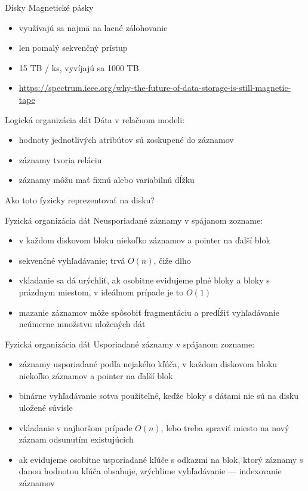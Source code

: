 \documentclass[12pt]{beamer}
\begin{document}
\begin{frame}[fragile]{Disky}
Magnetické pásky
\begin{itemize}
\item využívajú sa najmä na lacné zálohovanie
\item len pomalý sekvenčný prístup
\item 15 TB / ks, vyvíjajú sa 1000 TB
\item {\scriptsize\url{https://spectrum.ieee.org/why-the-future-of-data-storage-is-still-magnetic-tape}}
\end{itemize}
\end{frame}

\begin{frame}[fragile]{Logická organizácia dát}
Dáta v relačnom modeli:
\begin{itemize}
\item hodnoty jednotlivých atribútov sú zoskupené do záznamov
\item záznamy tvoria reláciu
\item záznamy môžu mať fixnú alebo variabilnú dĺžku
\end{itemize}
\vspace*{3mm}
Ako toto fyzicky reprezentovať na disku?
\end{frame}

\begin{frame}[fragile]{Fyzická organizácia dát}
Neusporiadané záznamy v spájanom zozname:
\begin{itemize}
\item v každom diskovom bloku niekoľko záznamov a pointer na ďalší blok
\item sekvenčné vyhľadávanie; trvá $O(n)$, čiže dlho
\item vkladanie sa dá urýchliť, ak osobitne evidujeme plné bloky a bloky s prázdnym miestom, v ideálnom prípade je to $O(1)$
\item mazanie záznamov môže spôsobiť fragmentáciu a predĺžiť vyhľadávanie neúmerne množstvu uložených dát
\end{itemize}
\end{frame}

\begin{frame}[fragile]{Fyzická organizácia dát}
Usporiadané záznamy v spájanom zozname:
\begin{itemize}
\item záznamy usporiadané podľa nejakého kľúča, v každom diskovom bloku niekoľko záznamov a pointer na ďalší blok
\item binárne vyhľadávanie sotva použiteľné, keďže bloky s dátami nie sú na disku uložené súvisle
\item vkladanie v najhoršom prípade $O(n)$, lebo treba spraviť miesto na nový záznam odsunutím existujúcich
\item ak evidujeme osobitne usporiadané kľúče s odkazmi na blok, ktorý záznamy s danou hodnotou kľúča obsahuje, zrýchlime vyhľadávanie --- indexovanie záznamov 
\end{itemize}
\end{frame}
\end{document}
